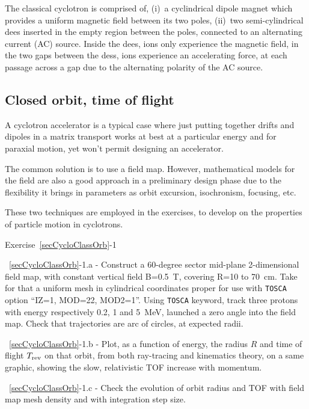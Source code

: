 The classical cyclotron  is comprised of, (i)~a cyclindrical dipole magnet which provides a uniform 
 magnetic field between its two poles, (ii)~two semi-cylindrical dees inserted 
in the empty region between the  poles, connected to an alternating current (AC) source. 
Inside the dees, ions only experience the magnetic field, in the two gaps between the dess, ions 
experience an accelerating force, at each passage across a gap due to the alternating polarity of the AC source.



\subsection{Closed orbit, time of flight \label{secCycloClassOrb}}

A cyclotron accelerator is a typical case 
where just putting together drifts and dipoles in a matrix transport works at best 
at a particular energy and for paraxial motion, yet won't permit designing an accelerator. 

The common solution is to use a field map. However, mathematical models for the field 
are also a good approach in a preliminary design phase due to the flexibility it brings 
in parameters as orbit excursion, isochronism, focusing, etc.

These two techniques are employed  in the exercises, to develop on the properties of particle motion 
in cyclotrons. 

\smallskip
\noindent {\small $\bullet$} Exercise~\ref{secCycloClassOrb}-1 

\noindent ~\ref{secCycloClassOrb}-1.a - 
Construct a 60-degree sector mid-plane 2-dimensional field map, with constant vertical field 
B=0.5~T, covering R=10 to 70~cm. Take for that a uniform mesh in cylindrical coordinates proper for use 
with \texttt{TOSCA} option ``IZ=1, MOD=22, MOD2=1''. 
Using \texttt{TOSCA} keyword, track three protons with energy respectively 0.2, 1 and 5~MeV,
launched a zero angle into the field map. 
Check that trajectories are arc of circles, at expected radii. 

\noindent ~\ref{secCycloClassOrb}-1.b - 
 Plot, as a function of energy, the 
  radius $R$ and  time of flight $T_{\rm rev}$ on that orbit, 
 from both ray-tracing and kinematics theory, on a same graphic, 
showing   the slow, relativistic TOF increase with momentum. 

\noindent ~\ref{secCycloClassOrb}-1.c - 
Check the evolution of orbit radius and TOF  with field map mesh density and with 
integration step size.



